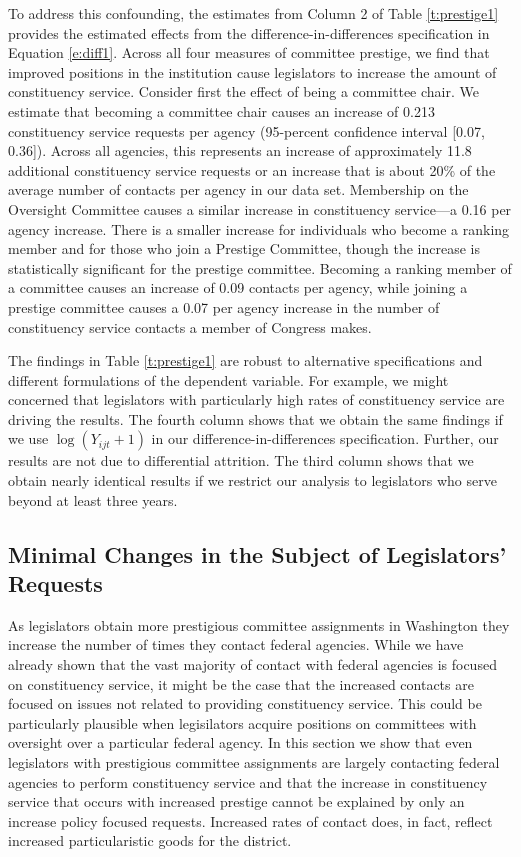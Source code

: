 \documentclass{article}
\begin{document}
To address this confounding, the estimates from Column 2 of Table \ref{t:prestige1} provides the estimated effects from the difference-in-differences specification in Equation \ref{e:diff1}.  Across all four measures of committee prestige, we find that improved positions in the institution cause legislators to increase the amount of constituency service.  Consider first the effect of being a committee chair.  We estimate that becoming a committee chair causes an increase of 0.213 constituency service requests per agency (95-percent confidence interval [0.07, 0.36]).  Across all agencies, this represents an increase of approximately 11.8 additional constituency service requests or an increase that is about 20\% of the average number of contacts per agency in our data set.  Membership on the Oversight Committee causes a similar increase in constituency service---a 0.16 per agency increase.  There is a smaller increase for individuals who become a ranking member and for those who join a Prestige Committee, though the increase is statistically significant for the prestige committee.  Becoming a ranking member of a committee causes an increase of 0.09 contacts per agency, while joining a prestige committee causes a 0.07 per agency increase in the number of constituency service contacts a member of Congress makes.

The findings in Table \ref{t:prestige1} are robust to alternative specifications and different formulations of the dependent variable.  For example, we might concerned that legislators with particularly high rates of constituency service are driving the results.  The fourth column shows that we obtain the same findings if we use $\log (Y_{ijt} + 1)$ in our difference-in-differences specification. Further, our results are not due to differential attrition.  The third column shows that we obtain nearly identical results if we restrict our analysis to legislators who serve beyond at least three years.      


\subsection{Minimal Changes in the Subject of Legislators' Requests}
As legislators obtain more prestigious committee assignments in Washington they increase the number of times they contact federal agencies.  While we have already shown that the vast majority of contact with federal agencies is focused on constituency service, it might be the case that the increased contacts are focused on issues not related to providing constituency service.  This could be particularly plausible when legisilators acquire positions on committees with oversight over a particular federal agency.  In this section we show that even legislators with prestigious committee assignments are largely contacting federal agencies to perform constituency service and that the increase in constituency service that occurs with increased prestige cannot be explained by only an increase policy focused requests.  Increased rates of contact does, in fact, reflect increased particularistic goods for the district.   
\end{document}
